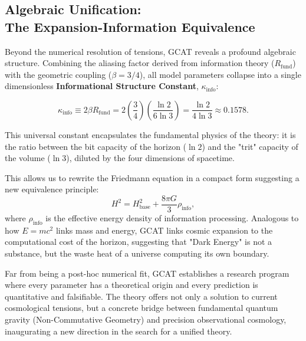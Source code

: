\documentclass[12pt, a4paper]{article}
\theoremstyle{plain}
\theoremstyle{definition}
\begin{document}
\subsection[Algebraic Unification: The Expansion-Information Equivalence]{Algebraic Unification: \\ The Expansion-Information Equivalence}

Beyond the numerical resolution of tensions, GCAT reveals a profound algebraic structure. Combining the aliasing factor derived from information theory ($R_{\text{fund}}$) with the geometric coupling ($\beta=3/4$), all model parameters collapse into a single dimensionless \textbf{Informational Structure Constant}, $\kappa_{\text{info}}$:

\begin{equation}
\kappa_{\text{info}} \equiv 2\beta R_{\text{fund}} = 2 \left(\frac{3}{4}\right) \left(\frac{\ln 2}{6\ln 3}\right) = \frac{\ln 2}{4\ln 3} \approx 0.1578.
\end{equation}

This universal constant encapsulates the fundamental physics of the theory: it is the ratio between the bit capacity of the horizon ($\ln 2$) and the "trit" capacity of the volume ($\ln 3$), diluted by the four dimensions of spacetime.

This allows us to rewrite the Friedmann equation in a compact form suggesting a new equivalence principle:
\begin{equation}
H^2 = H_{\text{base}}^2 + \frac{8\pi G}{3} \rho_{\text{info}},
\end{equation}
where $\rho_{\text{info}}$ is the effective energy density of information processing. Analogous to how $E=mc^2$ links mass and energy, GCAT links cosmic expansion to the computational cost of the horizon, suggesting that "Dark Energy" is not a substance, but the waste heat of a universe computing its own boundary.

Far from being a post-hoc numerical fit, GCAT establishes a research program where every parameter has a theoretical origin and every prediction is quantitative and falsifiable. The theory offers not only a solution to current cosmological tensions, but a concrete bridge between fundamental quantum gravity (Non-Commutative Geometry) and precision observational cosmology, inaugurating a new direction in the search for a unified theory.

\appendix
\end{document}
